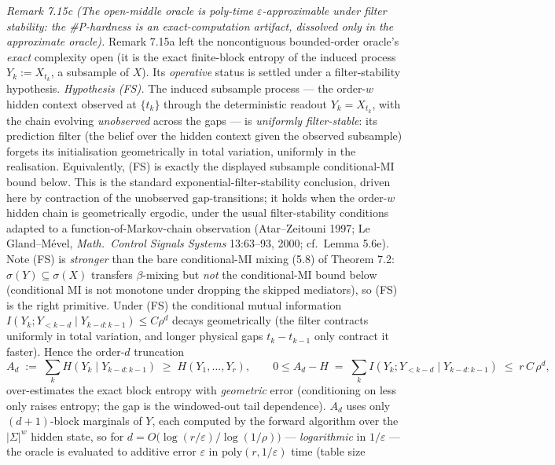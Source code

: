 \documentclass[
]{article}
\begin{document}
\emph{Remark 7.15c (The open-middle oracle is poly-time $\varepsilon$-approximable
under filter stability: the \#P-hardness is an exact-computation artifact, dissolved
only in the approximate oracle).} Remark 7.15a
left the noncontiguous bounded-order oracle's \emph{exact} complexity open (it is
the exact finite-block entropy of the induced process $Y_k:=X_{t_k}$, a subsample
of $X$). Its \emph{operative} status is settled under a filter-stability hypothesis.
\emph{Hypothesis (FS).} The induced subsample process --- the order-$w$ hidden
context observed at $\{t_k\}$ through the deterministic readout $Y_k=X_{t_k}$, with
the chain evolving \emph{unobserved} across the gaps --- is \emph{uniformly
filter-stable}: its prediction filter (the belief over the hidden context given the
observed subsample) forgets its initialisation geometrically in total variation,
uniformly in the realisation. Equivalently, (FS) is exactly the displayed subsample
conditional-MI bound below. This is the standard exponential-filter-stability
conclusion, driven here by contraction of the unobserved gap-transitions; it holds
when the order-$w$ hidden chain is geometrically ergodic, under the usual
filter-stability conditions adapted to a function-of-Markov-chain observation
(Atar--Zeitouni 1997; Le Gland--M\'evel, \emph{Math.\ Control Signals Systems}
13:63--93, 2000; cf.\ Lemma 5.6e). Note (FS) is \emph{stronger} than the bare
conditional-MI mixing (5.8) of Theorem 7.2: $\sigma(Y)\subseteq\sigma(X)$ transfers
$\beta$-mixing but \emph{not} the conditional-MI bound below (conditional MI is not
monotone under dropping the skipped mediators), so (FS) is the right primitive.
Under (FS) the conditional mutual information
$I(Y_k;Y_{<k-d}\mid Y_{k-d:k-1})\le C\rho^d$ decays geometrically (the filter
contracts uniformly in total variation, and longer physical gaps $t_{k}-t_{k-1}$
only contract it faster). Hence the order-$d$ truncation
\[
A_d \;:=\; \sum_k H\!\left(Y_k\mid Y_{k-d:k-1}\right)\;\ge\; H(Y_1,\dots,Y_r),
\qquad
0\le A_d - H \;=\; \sum_k I\!\left(Y_k;Y_{<k-d}\mid Y_{k-d:k-1}\right)\;\le\; r\,C\,\rho^d,
\]
over-estimates the exact block entropy with \emph{geometric} error (conditioning
on less only raises entropy; the gap is the windowed-out tail dependence). $A_d$
uses only $(d{+}1)$-block marginals of $Y$, each computed by the forward algorithm
over the $|\Sigma|^w$ hidden state, so for
$d=O\!\big(\log(r/\varepsilon)/\log(1/\rho)\big)$ --- \emph{logarithmic} in
$1/\varepsilon$ --- the oracle is evaluated to additive error $\varepsilon$ in
$\mathrm{poly}(r,1/\varepsilon)$ time (table size
\end{document}
